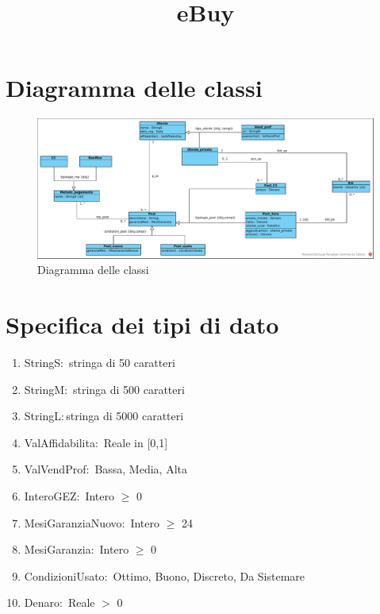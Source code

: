 \documentclass{article}
\title{eBuy}
\author{}
\date{}
\begin{document}
\maketitle

\tableofcontents

\newpage

\section{\label{sec:DiagrammaDelleClassi}Diagramma delle classi}
\begin{figure}[h]
    \centering
    \includegraphics[width=1\textwidth]{../Diagrammi/diagramma delle classi.pdf}
    \caption{Diagramma delle classi}
\end{figure}

\newpage
\section{\label{Sec:SpecificaTipoDiDato}Specifica dei tipi di dato}

\begin{enumerate}
    \item\label{sec:TipoStringS}StringS$:$ stringa di 50 caratteri
    \item\label{sec:TipoStringM}StringM$:$ stringa di 500 caratteri
    \item\label{sec:TipoStringL}StringL$:$stringa di 5000 caratteri
    \item\label{sec:TipoValAffidabilita}ValAffidabilita$:$ Reale in [0,1]
    \item\label{sec:TipoValVendProf}ValVendProf$:$ {Bassa, Media, Alta}
    \item\label{sec:TipoInteroGEZ}InteroGEZ$:$ Intero $\geq$ 0
    \item\label{sec:TipoMesiGaranziaNuovo}MesiGaranziaNuovo$:$ Intero $\geq$ 24
    \item\label{sec:TipoMesiGaranzia}MesiGaranzia$:$ Intero $\geq$ 0
    \item\label{sec:TipoCondizioniUsato}CondizioniUsato$:$ {Ottimo, Buono, Discreto, Da Sistemare}
    \item\label{sec:TipoPrezzo}Denaro$:$ Reale $>$ 0
\end{enumerate}
\end{document}
